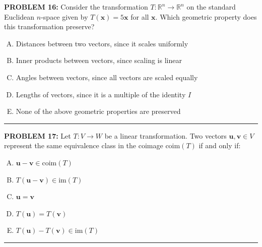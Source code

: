 \documentclass[12pt]{amsart}
\newcommand{\divider}{
  \vspace{-1em} %
  \noindent
  \raisebox{-0.15ex}{\textbullet}%
  \hspace{0.5em}%
  \rule[0.5ex]{0.95\textwidth}{1.0pt}%
  \hspace{0.5em}%
  \raisebox{-0.15ex}{\textbullet}%
  \vspace{0em} %
}
\begin{document}
{\bf PROBLEM 16: }
Consider the transformation $T: \mathbb{R}^n \to \mathbb{R}^n$ on the standard Euclidean $n$-space
given by $T(\mathbf{x}) = 5\mathbf{x}$ for all $\mathbf{x}$. Which geometric property does this transformation preserve?
%
\begin{enumerate}[(A)]
\item Distances between two vectors, since it scales uniformly
\item Inner products between vectors, since scaling is linear
\item Angles between vectors, since all vectors are scaled equally
\item Lengths of vectors, since it is a multiple of the identity $I$
\item None of the above geometric properties are preserved
\end{enumerate}
%
%
\divider



{\bf PROBLEM 17:}
Let $T: V \to W$ be a linear transformation. Two vectors $\mathbf{u}, \mathbf{v} \in V$ represent the same equivalence class in the coimage 
$\text{coim}(T)$ if and only if:
%
\begin{enumerate}[(A)]
\item $\mathbf{u} - \mathbf{v} \in \text{coim}(T)$
\item $T(\mathbf{u} - \mathbf{v}) \in \text{im}(T)$ 
\item $\mathbf{u} = \mathbf{v}$ 
\item $T(\mathbf{u}) = T(\mathbf{v})$
\item $T(\mathbf{u})-T(\mathbf{v}) \in \text{im}(T)$
\end{enumerate}
%
\divider
\end{document}
